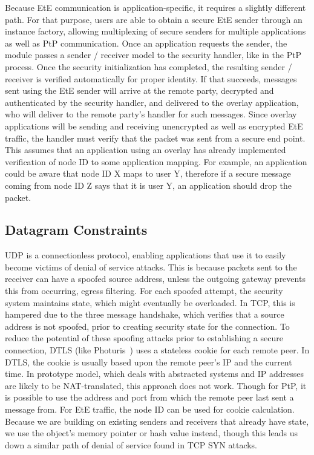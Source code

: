 Because EtE communication is application-specific, it requires a slightly
different path.  For that purpose, users are able to obtain a secure EtE
sender through an instance factory, allowing multiplexing of secure senders for
multiple applications as well as PtP communication.  Once an application
requests the sender, the module passes a sender / receiver model to the
security handler, like in the PtP process.  Once the security initialization
has completed, the resulting sender / receiver is verified automatically for
proper identity.  If that succeeds, messages sent using the EtE sender will
arrive at the remote party, decrypted and authenticated by the security
handler, and delivered to the overlay application, who will deliver to the
remote party's handler for such messages.  Since overlay applications will be
sending and receiving unencrypted as well as encrypted EtE traffic, the handler
must verify that the packet was sent from a secure end point.  This assumes
that an application using an overlay has already implemented verification of
node ID to some application mapping.  For example, an application could be
aware that node ID X maps to user Y, therefore if a secure message coming from
node ID Z says that it is user Y, an application should drop the packet.

\subsection{Datagram Constraints}
UDP is a connectionless protocol, enabling applications that use it to easily
become victims of denial of service attacks.  This is because packets sent to
the receiver can have a spoofed source address, unless the outgoing gateway
prevents this from occurring, egress filtering.  For each spoofed attempt, the
security system maintains state, which might eventually be overloaded.  In TCP,
this is hampered due to the three message handshake, which verifies that a
source address is not spoofed, prior to creating security state for the
connection.  To reduce the potential of these spoofing attacks prior to
establishing a secure connection, DTLS (like Photuris~\cite{photuris}) uses a
stateless cookie for each remote peer.  In DTLS, the cookie is usually based
upon the remote peer's IP and the current time.  In prototype model, which
deals with abstracted systems and IP addresses are likely to be NAT-translated,
this approach does not work.  Though for PtP, it is possible to use the address
and port from which the remote peer last sent a message from.  For EtE traffic,
the node ID can be used for cookie calculation.  Because we are building on
existing senders and receivers that already have state, we use the object's
memory pointer or hash value instead, though this leads us down a similar path
of denial of service found in TCP SYN attacks.

